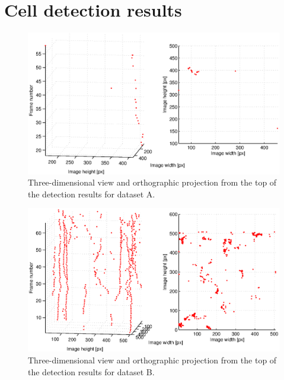 \chapter{Cell detection results}
	\label{app:appendix_detectionresults}

\begin{figure}
	\includegraphics[width=\textwidth]{images/fig_results_detector_sequences_1}
	\caption{Three-dimensional view and orthographic projection from the top of the detection results for dataset A.}
	\label{fig:results_detector_sequences_1}
\end{figure}

\begin{figure}
	\includegraphics[width=\textwidth]{images/fig_results_detector_sequences_2}
	\caption{Three-dimensional view and orthographic projection from the top of the detection results for dataset B.}
	\label{fig:results_detector_sequences_2}
\end{figure}

